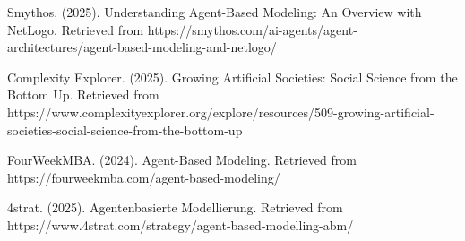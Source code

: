 \documentclass[main.tex]{subfiles}
\begin{document}
\begin{thebibliography}{20}
Smythos. (2025). Understanding Agent-Based Modeling: An Overview with NetLogo. Retrieved from https://smythos.com/ai-agents/agent-architectures/agent-based-modeling-and-netlogo/

Complexity Explorer. (2025). Growing Artificial Societies: Social Science from the Bottom Up. Retrieved from https://www.complexityexplorer.org/explore/resources/509-growing-artificial-societies-social-science-from-the-bottom-up

FourWeekMBA. (2024). Agent-Based Modeling. Retrieved from https://fourweekmba.com/agent-based-modeling/

4strat. (2025). Agentenbasierte Modellierung. Retrieved from https://www.4strat.com/strategy/agent-based-modelling-abm/

\end{thebibliography}
\end{document}
